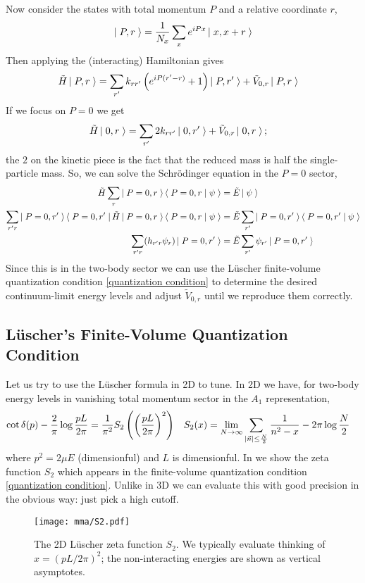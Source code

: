 Now consider the states with total momentum $P$ and a relative coordinate $r$,
\begin{align}
    \left|\;P,r\;\right\rangle = \frac{1}{N_x} \sum_x e^{iPx} \left|\;x,x+r\;\right\rangle
\end{align}
Then applying the (interacting) Hamiltonian gives
\begin{align}
    \tilde{H} \left|\;P,r\;\right\rangle
    &=
            \sum_{r'} k_{rr'} \left( e^{iP(r'-r)}+1\right)\left|\;P,r'\;\right\rangle
        +   \tilde{V}_{0,r} \left|\;P,r\;\right\rangle
\end{align}
If we focus on $P=0$ we get
\begin{align}
    \tilde{H} \left|\;0,r\;\right\rangle
    &=
            \sum_{r'} 2k_{rr'} \left|\;0,r'\;\right\rangle
        +   \tilde{V}_{0,r} \left|\;0,r\;\right\rangle;
\end{align}
the $2$ on the kinetic piece is the fact that the reduced mass is half the single-particle mass.
So, we can solve the Schr\"{o}dinger equation in the $P=0$ sector,
\begin{align}
    \tilde{H} \sum_r \left|\;P=0,r\;\right\rangle\left\langle\;P=0,r\;\middle|\;\psi\;\right\rangle &= \tilde{E}\left|\;\psi\;\right\rangle
    \\
    \sum_{r'r} \left|\;P=0, r'\;\right\rangle \left\langle\;P=0, r'\;\right| \tilde{H} \left|\;P=0,r\;\right\rangle\left\langle\;P=0,r\;\middle|\;\psi\;\right\rangle &= \tilde{E} \sum_{r'} \left|\;P=0, r'\;\right\rangle\left\langle\;P=0,r'\;\middle|\;\psi\;\right\rangle
    \\
    \sum_{r'r} (h_{r'r} \psi_r) \left|\;P=0, r'\;\right\rangle &= \tilde{E} \sum_{r'} \psi_{r'} \left|\;P=0, r'\;\right\rangle
    \label{eq:two-body schrodinger equation}
\end{align}
Since this is in the two-body sector we can use the L\"{u}scher finite-volume quantization condition \eqref{quantization condition} to determine the desired continuum-limit energy levels and adjust $\tilde{V}_{0,r}$ until we reproduce them correctly.

\subsection{L\"{u}scher's Finite-Volume Quantization Condition}

Let us try to use the L\"{u}scher formula in 2D to tune.
In 2D we have, for two-body energy levels in vanishing total momentum sector in the $A_1$ representation,
\begin{align}
	\cot \delta(p) - \frac{2}{\pi} \log \frac{pL}{2\pi} &= \frac{1}{\pi^2} S_2\left(\left(\frac{pL}{2\pi}\right)^2\right)
	&	
	S_2(x) &= \lim_{N\rightarrow\infty} \sum_{\left| \vec{n} \right| \leq \frac{N}{2}} \frac{1}{n^2-x} - 2\pi \log \frac{N}{2}
	\label{eq:quantization condition}
\end{align}
where $p^2=2\mu E$ (dimensionful) and $L$ is dimensionful.
In  we show the zeta function $S_2$ which appears in the finite-volume quantization condition \eqref{quantization condition}.
Unlike in 3D we can evaluate this with good precision in the obvious way: just pick a high cutoff.
\begin{figure}
	\texttt{[image: mma/S2.pdf]}
	\caption{The 2D L\"{u}scher zeta function $S_2$.  We typically evaluate thinking of $x = (pL/2\pi)^2$; the non-interacting energies are shown as vertical asymptotes.}
	\label{fig:S2}
\end{figure}

